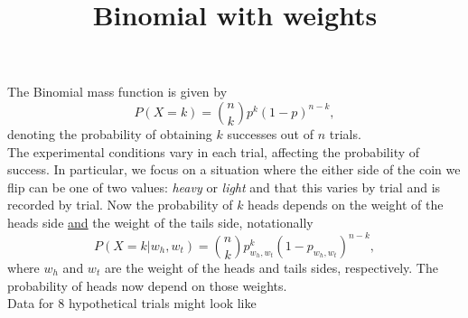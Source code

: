 \documentclass[12pt]{article}\usepackage[]{graphicx}\usepackage[]{color}
\title{Binomial with weights}
\author{}
\date{}
\begin{document}
\maketitle

The Binomial mass function is given by
\begin{equation}
  P(X = k) = {n \choose k} p^k (1-p)^{n-k},
\end{equation}
denoting the probability of obtaining $k$ successes out of $n$ trials.\\
The experimental conditions vary in each trial, affecting the probability of success. In particular, we focus on a situation where the either side of the coin we flip can be one of two values: \emph{heavy} or \emph{light} and that this varies by trial and is recorded by trial. Now the probability of $k$ heads depends on the weight of the heads side \underline{and} the weight of the tails side, notationally
\begin{equation}
  P(X = k | w_{h}, w_{t}) = {n \choose k} p_{w_{h}, w_{t}}^k (1-p_{w_{h}, w_{t}})^{n-k},
\end{equation}
where $w_h$ and $w_t$ are the weight of the heads and tails sides, respectively. The probability of heads now depend on those weights.\\
Data for 8 hypothetical trials might look like
\end{document}

